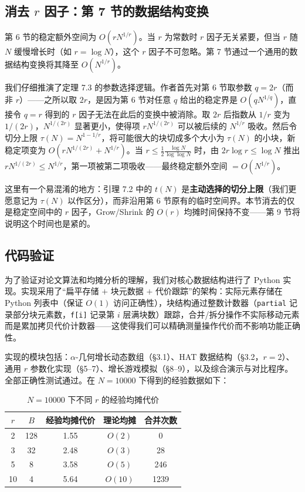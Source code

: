 \documentclass[12pt,a4paper]{ctexart}
\begin{document}
\subsection{消去 $r$ 因子：第 7 节的数据结构变换}

第 6 节的稳定额外空间为 $O(rN^{1/r})$。当 $r$ 为常数时 $r$ 因子无关紧要，但当 $r$ 随 $N$ 缓慢增长时（如 $r = \log N$），这个 $r$ 因子不可忽略。第 7 节通过一个通用的数据结构变换将其降至 $O(N^{1/r})$。

我们仔细推演了定理 7.3 的参数选择逻辑。作者首先对第 6 节取参数 $q = 2r$（而非 $r$）——之所以取 $2r$，是因为第 6 节对任意 $q$ 给出的稳定界是 $O(qN^{1/q})$，直接令 $q = r$ 得到的 $r$ 因子无法在此后的变换中被消除。取 $2r$ 后指数从 $1/r$ 变为 $1/(2r)$，$N^{1/(2r)}$ 显著更小，使得项 $rN^{1/(2r)}$ 可以被后续的 $N^{1/r}$ 吸收。然后令切分上限 $\tau(N) = N^{1-1/r}$，将可能很大的块切成多个大小为 $\tau(N)$ 的小块，新稳定项变为 $O(rN^{1/(2r)} + N^{1/r})$。当 $r \le \frac{1}{2}\frac{\log N}{\log\log N}$ 时，由 $2r\log r \le \log N$ 推出 $rN^{1/(2r)} \le N^{1/r}$，第一项被第二项吸收——最终稳定额外空间 $= O(N^{1/r})$。

这里有一个易混淆的地方：引理 7.2 中的 $t(N)$ 是\textbf{主动选择的切分上限}（我们更愿意记为 $\tau(N)$ 以作区分），而非沿用第 6 节原有的临时空间界。本节消去的仅是稳定空间中的 $r$ 因子，Grow/Shrink 的 $O(r)$ 均摊时间保持不变——第 9 节将说明这个时间也是紧的。

\subsection{代码验证}

为了验证对论文算法和均摊分析的理解，我们对核心数据结构进行了 Python 实现。实现采用了``扁平存储 $+$ 块元数据 $+$ 代价跟踪''的架构：实际元素存储在 Python 列表中（保证 $O(1)$ 访问正确性），块结构通过整数计数器（\texttt{partial} 记录部分块元素数，\texttt{f[i]} 记录第 $i$ 层满块数）跟踪，合并/拆分操作不实际移动元素而是累加拷贝代价计数器——这使得我们可以精确测量操作代价而不影响功能正确性。

实现的模块包括：$\alpha$-几何增长动态数组（\S 3.1）、HAT 数据结构（\S 3.2，$r=2$）、通用 $r$ 参数化实现（\S 5–7）、增长游戏模拟（\S 8–9），以及综合演示与对比程序。全部正确性测试通过。在 $N=10000$ 下得到的经验数据如下：

\begin{table}[htbp]
\centering
\caption{$N=10000$ 下不同 $r$ 的经验均摊代价}
\begin{tabular}{@{}ccccc@{}}
\toprule
$r$ & $B$ & 经验均摊代价 & 理论均摊 & 合并次数 \\
\midrule
2 & 128 & 1.55 & $O(2)$ & 0 \\
3 & 32  & 2.48 & $O(3)$ & 28 \\
5 & 8   & 3.58 & $O(5)$ & 246 \\
10 & 4  & 5.64 & $O(10)$ & 1239 \\
\bottomrule
\end{tabular}
\end{table}
\end{document}
